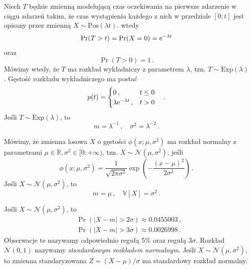 \documentclass{myclass}
\numberwithin{equation}{subsection}
\begin{document}
\begin{definition}
Niech \(T\) będzie zmienną modelującą czas oczekiwania na pierwsze zdarzenie w ciągu zdarzeń takim,
że czas wystąpienia każdego z nich w przedziale \([0;t]\) jest opisany przez zmienną \(X \sim
\mathrm{Pos}(\lambda t)\). wtedy
\begin{equation*}
    \Pr(T > t) = \Pr(X = 0) = \mathrm{e}^{-\lambda t}
\end{equation*}
oraz
\begin{equation*}
    \Pr(T > 0) = 1\,.
\end{equation*}
Mówimy wtedy, że \(T\) ma rozkład wykładniczy z parametrem \(\lambda\), tzn. \(T \sim
\mathrm{Exp}(\lambda)\). Gęstość rozkładu wykładniczego ma postać
\begin{equation*}
    p(t) = \begin{cases}
        0\,,&t \leq 0\\
        \lambda \mathrm{e}^{-\lambda t}\,,&t > 0
    \end{cases}\quad.
\end{equation*}
Jeśli \(T \sim \mathrm{Exp}(\lambda)\), to
\begin{equation*}
    m = \lambda^{-1}\,,\quad \sigma^2 = \lambda^{-2}\,.
\end{equation*}
\end{definition}

\begin{definition}
Mówimy, że zmienna losowa \(X\) o gęstości \(\phi(x;\mu,\sigma^2)\) ma rozkład normalny z
parametrami \(\mu \in \mathbb{R} , \sigma^2 \in [0;+\infty)\), tzn. \(X \sim
\mathcal{N}(\mu,\sigma^2)\), jeśli    
\begin{equation*}
    \phi(x; \mu, \sigma^2) = \frac{1}{\sqrt{2 \pi \sigma^2}} \exp\left(-\frac{(x-\mu)^2}{2\sigma^2}\right)\,.
\end{equation*}
Jeśli \(X \sim \mathcal{N}(\mu,\sigma^2)\), to
\begin{equation*}
    m = \mu\,,\quad \mathbb{V}[X] = \sigma^2\,.
\end{equation*}
\end{definition}

Jeśli \(X \sim \mathcal{N}(\mu,\sigma^2)\), to
\begin{equation}
    \begin{split}        
        &\Pr(|X - m| > 2\sigma) \approx 0.0455003\,,\\
        &\Pr(|X - m| > 3\sigma) \approx 0.0026998\,.
    \end{split}
\end{equation}
Obserwacje te nazywamy odpowiednio regułą 5\% oraz regułą \(3\sigma\). Rozkład \(\mathcal{N}(0,1)\)
nazywamy \emph{standardowym rozkładem normalnym}. Jeśli \(X \sim \mathcal{N}(\mu,\sigma^2)\), to
zmienna standaryzowana \(Z = (X - \mu) / \sigma\) ma standardowy rozkład normalny.
\end{document}

